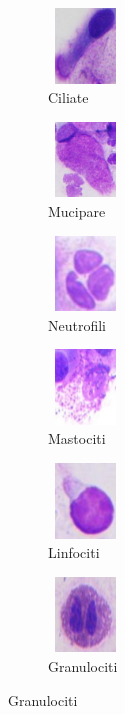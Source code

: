 \documentclass[italian,10pt,a4paper]{article}
\begin{document}
					\begin{figure}[h]
						\centering
						\begin{subfigure}[h]{70px}
							\centering
							\includegraphics[width=2cm, height=2cm]{ciliate.jpg}
							\caption{Ciliate}
							\label{fig:image1}
						\end{subfigure}
						\hfill
						\begin{subfigure}[h]{70px}
							\centering
							\includegraphics[width=2cm, height=2cm]{mucipare.jpg}
							\caption{Mucipare}
							\label{fig:image2}
						\end{subfigure}
						\hfill
						\begin{subfigure}[h]{70px}
							\centering
							\includegraphics[width=2cm, height=2cm]{neutrofili.jpg}
							\caption{Neutrofili}
							\label{fig:image3}
						\end{subfigure}
		
						\label{fig:multiple_images1}
						\begin{subfigure}[h]{70px}
							\centering
							\includegraphics[width=2cm, height=2cm]{mast.jpg}
							\caption{Mastociti}
							\label{fig:image4}
						\end{subfigure}
						\hfill
						\begin{subfigure}[h]{70px}
							\centering
							\includegraphics[width=2cm, height=2cm]{linfociti.jpg}
							\caption{Linfociti}
							\label{fig:image5}
						\end{subfigure}
						\hfill
						\begin{subfigure}[h]{70px}
							\centering
							\includegraphics[width=2cm, height=2cm]{eosinophil.jpg}
							\caption{Granulociti}
							\label{fig:image6}
						\end{subfigure}
		

\end{figure}
\end{document}
